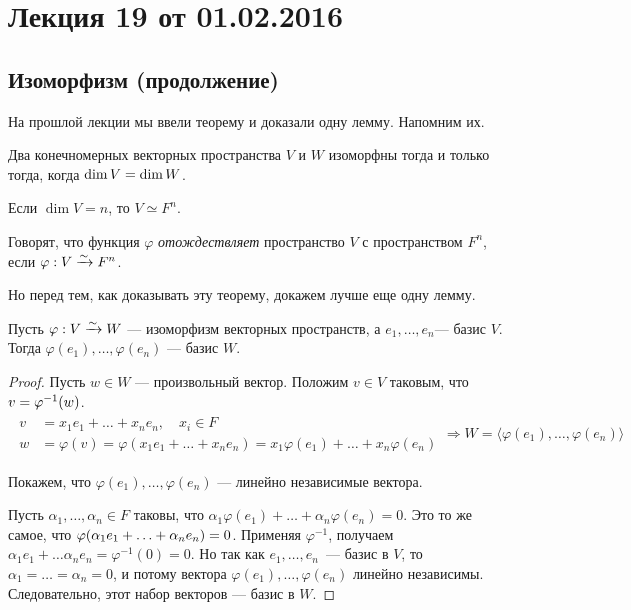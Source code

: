 \renewcommand{\phi}{\varphi}

\section{Лекция 19 от 01.02.2016}

\subsection{Изоморфизм (продолжение)}
На прошлой лекции мы ввели теорему и доказали одну лемму. Напомним их.

\begin{Theorem}
Два конечномерных векторных пространства $V$ и $W$ изоморфны тогда и только тогда, когда  $\dim V \hm= \dim W$.
\end{Theorem}

\begin{Lemma}[1]
Если $\dim V = n$, то $V \simeq F^n$.
\end{Lemma}

\begin{Comment}
Говорят, что функция $\phi$ \textit{отождествляет} пространство $V$ с пространством $F^n$, если $\phi: V \isom F^n$.
\end{Comment}

Но перед тем, как доказывать эту теорему, докажем лучше еще одну лемму.
\begin{Lemma}[2]
Пусть $\phi: V \isom W$ --- изоморфизм векторных пространств, а $e_1, \ldots, e_n$--- базис $V$. Тогда $\phi(e_1), \ldots, \phi(e_n)$ --- базис $W$.
\end{Lemma}

\begin{proof}
Пусть $w \in W$ --- произвольный вектор. Положим $v \in V$ таковым, что $v \hm= \phi^{-1}(w)$.
\begin{gather*}
\begin{aligned}
v &= x_1e_1 + \ldots + x_ne_n, \quad x_i \in F \\
w &= \phi(v) = \phi(x_1e_1 + \ldots + x_ne_n) = x_1\phi(e_1) + \ldots + x_n\phi(e_n)
\end{aligned} \Rightarrow W = \langle \phi(e_1), \ldots, \phi(e_n)\rangle
\end{gather*}

Покажем, что $\phi(e_1), \ldots, \phi(e_n)$ --- линейно независимые вектора.

Пусть $\alpha_1, \ldots, \alpha_n \in F$ таковы, что $\alpha_1\phi(e_1) + \ldots + \alpha_n\phi(e_n) = 0$. Это то же самое, что $\phi(\alpha_1 e_1 \hm+ \ldots + \alpha_n e_n) = 0$. Применяя $\phi^{-1}$, получаем $\alpha_1 e_1 + \ldots \alpha_n e_n = \phi^{-1}(0) = 0$. Но так как $e_1, \ldots, e_n$~--- базис в $V$, то $\alpha_1 = \ldots= \alpha_n = 0$, и потому вектора $\phi(e_1), \ldots, \phi(e_n)$ линейно независимы. Следовательно, этот набор векторов --- базис в $W$.
\end{proof}

